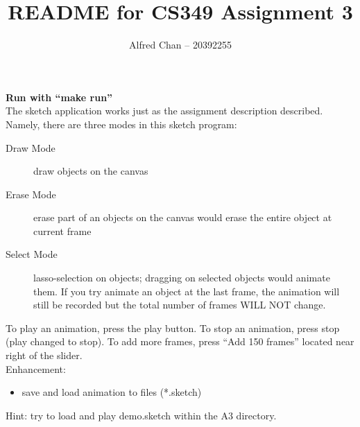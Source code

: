 \documentclass[12pt]{article}
\title{README for CS349 Assignment 3}
\author{Alfred Chan -- 20392255}
\begin{document}
\maketitle
{ \noindent \bf Run with ``make run'' }\\

\noindent The sketch application works just as the assignment description described.
Namely, there are three modes in this sketch program:
\begin{description}
\item[Draw Mode] draw objects on the canvas
\item[Erase Mode] erase part of an objects on the canvas would erase the entire object at current frame
\item[Select Mode] lasso-selection on objects; dragging on selected objects would animate them. If you try animate an object at the last frame, the animation will still be recorded but the total number of frames WILL NOT change.
\end{description}

To play an animation, press the play button.
To stop an animation, press stop (play changed to stop).
To add more frames, press ``Add 150 frames'' located near right of the slider.\\

\noindent Enhancement:
\begin{itemize}
\item save and load animation to files (*.sketch)
\end{itemize}
Hint: try to load and play demo.sketch within the A3 directory.
\end{document}
